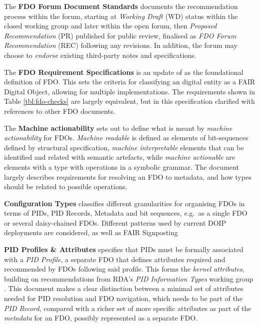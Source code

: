 \documentclass[fleqn,10pt,lineno]{wlpeerj}
\begin{document}
The \textbf{FDO Forum Document Standards} \cite{TQdku4YF} documents the recommendation process within the forum, starting at \emph{Working Draft} (WD) status within the closed working group and later within the open forum, then \emph{Proposed Recommendation} (PR) published for public review, finalised as \emph{FDO Forum Recommendation} (REC) following any revisions. In addition, the forum may choose to \emph{endorse} existing third-party notes and specifications.

The \textbf{FDO Requirement Specifications} \cite{yygVPoL0} is an update of \cite{RwvirqWg} as the foundational definition of FDO. This sets the criteria for classifying an digital entity as a FAIR Digital Object, allowing for multiple implementations. The requirements shown in Table \ref{tbl:fdo-checks} are largely equivalent, but in this specification clarified with references to other FDO documents.

The \textbf{Machine actionability} \cite{iJeys0T5} sets out to define what is meant by \emph{machine actionability} for FDOs. \emph{Machine readable} is defined as elements of bit-sequences defined by structural specification, \emph{machine interpretable} elements that can be identified and related with semantic artefacts, while \emph{machine actionable} are elements with a type with operations in a symbolic grammar. The document largely describes requirements for resolving an FDO to metadata, and how types should be related to possible operations.

\textbf{Configuration Types} \cite{SPd0uEqO} classifies different granularities for organising FDOs in terms of PIDs, PID Records, Metadata and bit sequences, e.g.~as a single FDO or several daisy-chained FDOs. Different patterns used by current DOIP deployments are considered, as well as FAIR Signposting \cite{snykkm7R}

\textbf{PID Profiles \& Attributes} \cite{ljVViWCl} specifies that PIDs must be formally associated with a \emph{PID Profile}, a separate FDO that defines attributes required and recommended by FDOs following said profile. This forms the \emph{kernel attributes}, building on recommendations from RDA's \emph{PID Information Types} working group \cite{lCoshHXg}. This document makes a clear distinction between a minimal set of attributes needed for PID resolution and FDO navigation, which needs to be part of the \emph{PID Record}, compared with a richer set of more specific attributes as part of the \emph{metadata} for an FDO, possibly represented as a separate FDO.
\end{document}
